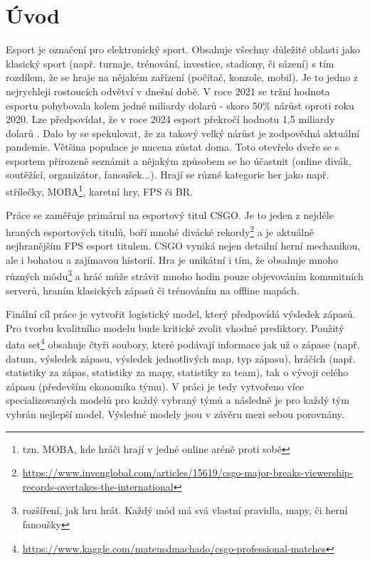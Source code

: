 \chapter{Úvod}
Esport je označení pro elektronický sport. Obsahuje všechny důležité oblasti jako klasický sport (např. turnaje, trénování, investice, stadiony, či sázení)
s tím rozdílem, že se hraje na nějakém zařízení (počítač, konzole, mobil).
Je to jedno z nejrychleji rostoucích odvětví v dnešní době. V roce 2021 se tržní hodnota esportu pohybovala kolem jedné miliardy dolarů - skoro
50\% nárůst oproti roku 2020. Lze předpovídat, že v roce 2024 esport překročí hodnotu 1,5 miliardy dolarů \cite{Gough2021}.
Dalo by se spekulovat, že za takový velký nárůst je zodpovědná aktuální pandemie. Většina populace je nucena zůstat doma. Toto otevřelo dveře
se s esportem přirozeně seznámit a nějakým způsobem se ho účastnit (online divák, soutěžící, organizátor, fanoušek...). 
Hrají se různé kategorie her
{\color{red}
jako např.
}
střílečky, \ac{MOBA}\footnote{tzn. MOBA, kde hráči hrají v jedné online aréně proti sobě}, karetní hry, \ac{FPS} či \ac{BR}.

Práce se zaměřuje primární na esportový titul \acf{CSGO}. Je to jeden z nejdéle hraných esportových titulů, boří mnohé divácké
rekordy\footnote{\scriptsize \url{https://www.invenglobal.com/articles/15619/csgo-major-breaks-viewership-records-overtakes-the-international}}
a je aktuálně nejhranějším \ac{FPS} esport titulem. \ac{CSGO} vyniká nejen detailní herní mechanikou, ale i bohatou a zajímavou historií. Hra
je unikátní i tím, že obsahuje mnoho různých módu\footnote{rozšíření, jak hru hrát. Každý mód má svá vlastní pravidla, mapy, či herní fanoušky}
a hráč může strávit mnoho hodin pouze objevováním komunitních serverů, hraním klasických zápasů či trénováním na offline mapách.

{\color{red}
Finální cíl práce je vytvořit logistický model, který předpovídá výsledek zápasů. Pro tvorbu kvalitního modelu bude kritické zvolit vhodné prediktory. Použitý data
set\footnote{\url{https://www.kaggle.com/mateusdmachado/csgo-professional-matches}} obsahuje čtyři soubory, které podávají informace jak už o zápase (např. datum, 
výsledek zápasu, výsledek jednotlivých map, typ zápasu), hráčích (např. statistiky za zápas, statistiky za mapy, statistiky za team), tak o 
vývoji celého zápasu (především ekonomika týmu). V práci je tedy vytvořeno více specializovaných modelů pro každý vybraný týmů a následně
je pro každý tým vybrán nejlepší model. Výsledné modely jsou v závěru mezi sebou porovnány.
}

